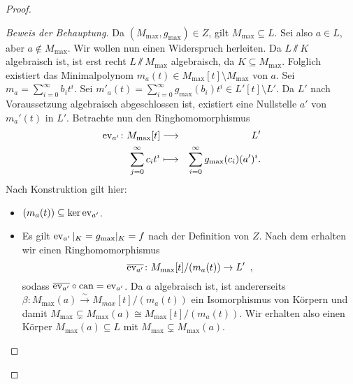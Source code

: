 \documentclass[12pt,a4paper]{scrartcl}
\begin{document}
\begin{proof}
\begin{enumerate}
\begin{itemize}
			\begin{proof}[Beweis der Behauptung]
				Da $(M_{\max}, g_{\max})\in Z$, gilt $M_{\max}\subseteq L$. Sei also $a\in L$, aber $a\notin M_{\max}$. Wir wollen nun einen Widerspruch herleiten. Da $L\sslash K$ algebraisch ist, ist erst recht $L\sslash M_{\max}$ algebraisch, da $K\subseteq M_{\max}$. Folglich existiert das Minimalpolynom $m_a(t)\in M_{\max}[t]\setminus M_{\max}$ von $a$. Sei $m_a = \sum_{i = 0}^{\infty}b_it^i$.  Sei $m'_a(t) = \sum_{i = 0}^{\infty}g_{\max}(b_i)t^i\in L'[t]\setminus L'$. Da $L'$ nach Voraussetzung algebraisch abgeschlossen ist, existiert eine Nullstelle $a'$ von $m_a'(t)$ in $L'$. Betrachte nun den Ringhomomorphismus
				\begin{eqnarray*}
					\operatorname{ev}_{a'}\colon M_{\max}[t] &\longrightarrow& L'\\
					\sum_{j = 0}^{\infty} c_it^i &\longmapsto& \sum_{i = 0}^{\infty} g_{\max}(c_i)(a')^i.
				\end{eqnarray*}
				Nach Konstruktion gilt hier:
				\begin{itemize}
					\item $(m_a(t))\subseteq \operatorname{ker}\operatorname{ev}_{a'}$.
					\item Es gilt $\operatorname{ev}_{a'}|_K = g_{\max}|_K = f$ nach der Definition von $Z$. Nach dem  erhalten wir einen Ringhomomorphismus
					\[\overline{\operatorname{ev}_{a'}}\colon M_{\max}[t]/(m_a(t))\to L'\enspace,\]
					sodass $\overline{\operatorname{ev}_{a'}}\circ \operatorname{can} = \operatorname{ev}_{a'}$. Da $a$ algebraisch ist, ist andererseits $\beta: M_{\max}(a) \xrightarrow{\sim} M_{max}[t]/(m_a(t))$ ein Isomorphismus von Körpern und damit $M_{\max}\subsetneq M_{\max}(a)\cong M_{\max}[t]/(m_a(t))$. Wir erhalten also einen Körper $M_{\max}(a)\subseteq L$ mit $M_{\max}\subsetneq M_{\max}(a)$.
					

\end{itemize}
\end{proof}
\end{itemize}
\end{enumerate}
\end{proof}
\end{document}

